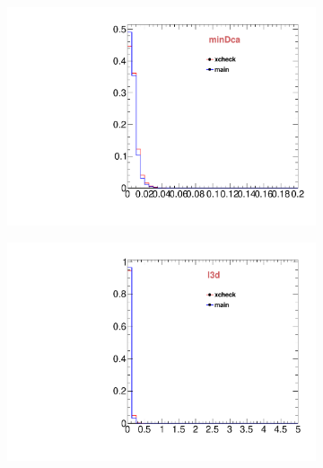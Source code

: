 \begin{figure}
\begin{subfigure}[b]{0.2\textwidth}
                \includegraphics[width=\textwidth]{Figures/VariablesComparison/Data_barrel_figs/docatrk}
                \label{fig:Data_barrel_docatrk}
        \end{subfigure}
        \begin{subfigure}[b]{0.2\textwidth}
                \centering
                \includegraphics[width=\textwidth]{Figures/VariablesComparison/Data_barrel_figs/fl3d}
                \label{fig:Data_barrel_fl3d}
        \end{subfigure}
        \begin{subfigure}[b]{0.2\textwidth}
                \centering

\end{subfigure}
\end{figure}
